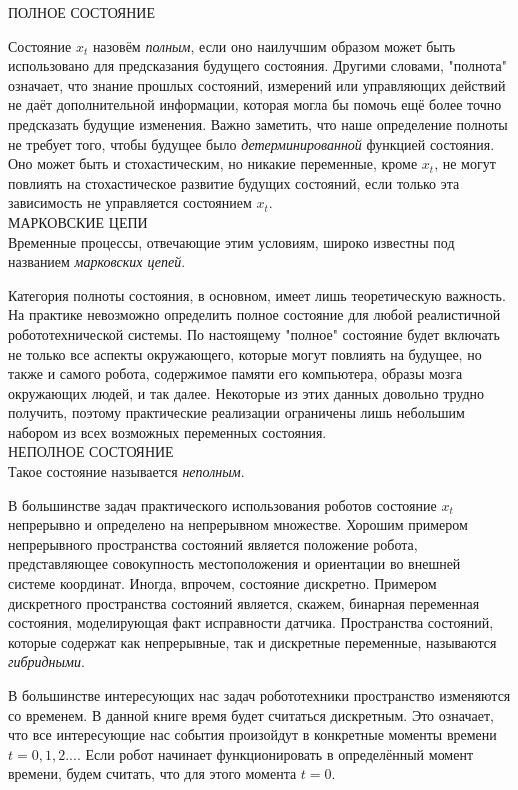 \documentclass[10pt,a4paper]{article}
\begin{document}
 ПОЛНОЕ СОСТОЯНИЕ
  
 Состояние $x_t$ назовём \textit{полным}, если оно наилучшим образом может быть использовано для предсказания будущего состояния. Другими словами, "полнота" означает, что знание прошлых состояний, измерений или управляющих действий не даёт дополнительной информации, которая могла бы помочь ещё более точно предсказать будущие изменения. Важно заметить, что наше определение полноты не требует того, чтобы будущее было \textit{детерминированной} функцией состояния. 
 Оно может быть и стохастическим, но никакие переменные, кроме $x_t$, не могут повлиять на стохастическое развитие будущих состояний, если только эта зависимость не управляется  состоянием $x_t$.\\
 МАРКОВСКИЕ ЦЕПИ\\
 Временные процессы, отвечающие этим условиям, широко известны под названием \textit{марковских цепей}.
 
 Категория полноты состояния, в основном, имеет лишь теоретическую важность. На практике невозможно определить полное состояние для любой реалистичной робототехнической системы. По настоящему "полное" состояние будет включать не только все аспекты окружающего, которые могут повлиять на будущее, но также и самого робота, содержимое памяти его компьютера, образы мозга окружающих людей, и так далее. Некоторые из этих данных довольно трудно получить, поэтому практические реализации ограничены лишь небольшим набором из всех возможных переменных состояния.\\
 НЕПОЛНОЕ СОСТОЯНИЕ\\ 
 Такое состояние называется \textit{неполным}.
  
 В большинстве задач практического использования роботов состояние $x_t$ непрерывно и определено на непрерывном множестве. Хорошим примером непрерывного пространства состояний является положение робота, представляющее совокупность местоположения и ориентации во внешней системе координат. Иногда, впрочем, состояние дискретно. Примером дискретного пространства состояний является, скажем, бинарная переменная состояния, моделирующая факт исправности датчика. Пространства состояний, которые содержат как непрерывные, так и дискретные переменные, называются \textit{гибридными}.
 
 В большинстве интересующих нас задач робототехники пространство изменяются со временем. В данной книге время будет считаться дискретным. Это означает, что все интересующие нас события произойдут в конкретные моменты времени $t = 0, 1, 2 . . .$. Если робот начинает функционировать в определённый момент времени, будем считать, что  для этого момента $t = 0$.\\
 
\end{document}

